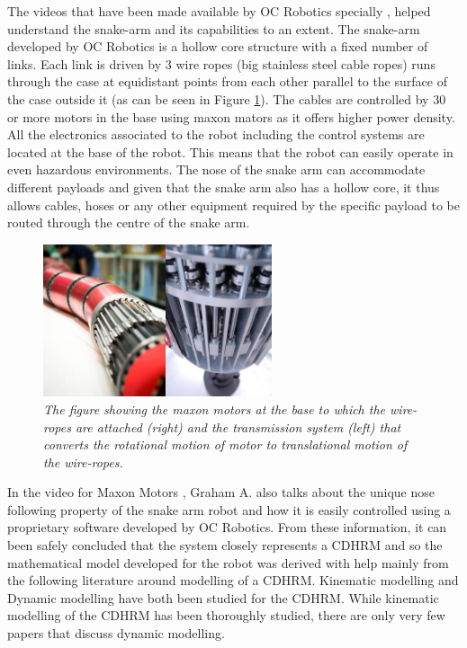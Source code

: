 \documentclass[a4paper,12pt]{report}
\begin{document}
The videos that have been made available by OC Robotics specially \cite{OCRobotics_videos_1, OCRobotics_videos_2, OCRobotics_videos_3, OCRobotics_videos_4}, helped understand the snake-arm and its capabilities to an extent. The snake-arm developed by OC Robotics is a hollow core structure with a fixed number of links. Each link is driven by 3 wire ropes (big stainless steel cable ropes) runs through the case at equidistant points from each other parallel to the surface of the case outside it \cite{OCRobotics_article} (as can be seen in Figure \ref{base-pic}). The cables are controlled by 30 or more motors in the base \cite{OCRobotics_videos_2} using maxon mators as it offers higher power density. All the electronics associated to the robot including the control systems are located at the base of the robot. This means that the robot can easily operate in even hazardous environments. The nose of the snake arm can accommodate different payloads and given that the snake arm also has a hollow core, it thus allows cables, hoses or any other equipment required by the specific payload to be routed through the centre of the snake arm.
\begin{figure}
	\centering
	\includegraphics[width=0.6\textwidth]{images/maxon-motors.jpg}
	\caption{\textit{The figure showing the maxon motors at the base to which the wire-ropes are attached (right) and the transmission system (left) that converts the rotational motion of motor to translational motion of the wire-ropes. \cite{ CNNarticle}}}
	\label{base-pic}
\end{figure}
In the video for Maxon Motors \cite{OCRobotics_videos_2}, Graham A. also talks about the unique nose following property of the snake arm robot and how it is easily controlled using a proprietary software developed by OC Robotics. 
From these information, it can been safely concluded that the system closely represents a CDHRM and so the mathematical model developed for the robot was derived with help mainly from the following literature \cite{RN30, RN31, RN29} around modelling of a CDHRM. Kinematic modelling and Dynamic modelling have both been studied for the CDHRM. While kinematic modelling of the CDHRM has been thoroughly studied, there are only very few papers that discuss dynamic modelling.
\end{document}
